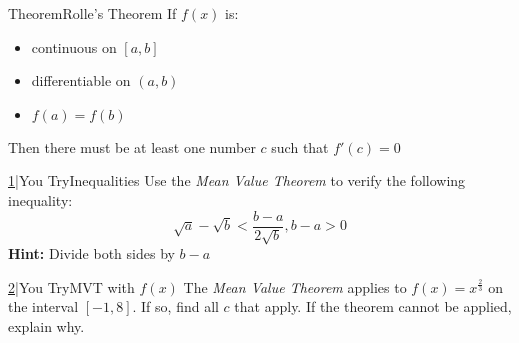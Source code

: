 \documentclass{MathNotes}
\newenvironment{theorem}[1]{\begin{GrayBox}{Theorem}{#1}}{\end{GrayBox}}
\newenvironment{practice}[2]{\begin{PurpleBox}{\texorpdfstring{#1}\Big|You Try}{#2}}{\end{PurpleBox}}
\begin{document}
\begin{multicols}{2}
\begin{center}
\end{center}
\begin{theorem}{Rolle's Theorem}
    If $f(x)$ is:
    \begin{itemize}
        \item continuous on $[a, b]$
        \item differentiable on $(a, b)$
        \item $f(a)=f(b)$
    \end{itemize}
    Then there must be at least one number $c$ such that $f'(c)=0$
\end{theorem}
\end{multicols}
\begin{multicols}{2}
\begin{practice}{\hyperref[ans:3.2-1]{1}}{Inequalities}\label{prac:3.2-1}
    Use the \textit{Mean Value Theorem} to verify the following inequality:
    $$\sqrt{a}-\sqrt{b}<\frac{b-a}{2\sqrt{b}},b-a>0$$
    \textbf{Hint:} Divide both sides by $b-a$
\end{practice}
\begin{practice}{\hyperref[ans:3.2-2]{2}}{MVT with $f(x)$}\label{prac:3.2-2}
    The \textit{Mean Value Theorem} applies to $f(x)=x^{\frac{2}{3}}$ on the 
    interval $[-1, 8]$. If so, find all $c$ that apply. If the theorem cannot
    be applied, explain why.
\end{practice}
\end{multicols}
\end{document}
